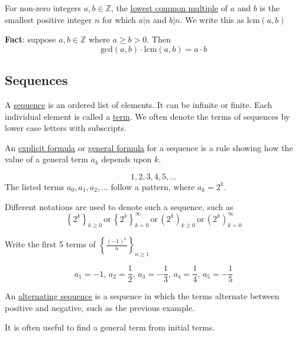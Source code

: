 \begin{definition}
    For non-zero integers $a,b\in\mathbb Z$, the \underline{lowest common multiple} of $a$ and $b$ is the smallest positive integer $n$ for which $a|n$ and $b|n$. We write this as $\text{lcm}\left(a,b\right)$
\end{definition}

\textbf{Fact}: suppose $a,b\in\mathbb{Z}$ where $a\geq b > 0$. Then $$\text{gcd}\left(a,b\right)\cdot\text{lcm}\left(a,b\right) = a\cdot b$$

\newpage
\subsection{Sequences}
\begin{definition}
    A \underline{sequence} is an ordered list of elements. It can be infinite or finite. Each individual element is called a \underline{term}. We often denote the terms of sequences by lower case letters with subscripts.
\end{definition}

An \underline{explicit formula} or \underline{general formula} for a sequence is a rule showing how the value of a general term $a_k$ depends upon $k$.

\begin{example}
$$1,2,3,4,5,\dots$$
The listed terms $a_0, a_1, a_2, \dots$ follow a pattern, where $a_k = 2^k$.

Different notations are used to denote such a sequence, such as $$\left\{2^k\right\}_{k\geq 0}\,\text{or}\,\left\{2^k\right\}^\infty_{k=0}\,\text{or}\,\left(2^k\right)_{k\geq 0}\,\text{or}\,\left(2^k\right)^\infty_{k=0}$$
\end{example}

\begin{example}
    Write the first 5 terms of $\left\{\frac{\left(-1\right)^n}{n}\right\}_{n\geq 1}$

    $$a_1 = -1,\, a_2 = \frac12,\, a_3 = -\frac13,\, a_4 = \frac14,\, a_5 = -\frac15$$
\end{example}

\begin{definition}
    An \underline{alternating sequence} is a sequence in which the terms alternate between positive and negative, such as the previous example.
\end{definition}

It is often useful to find a general term from initial terms.

